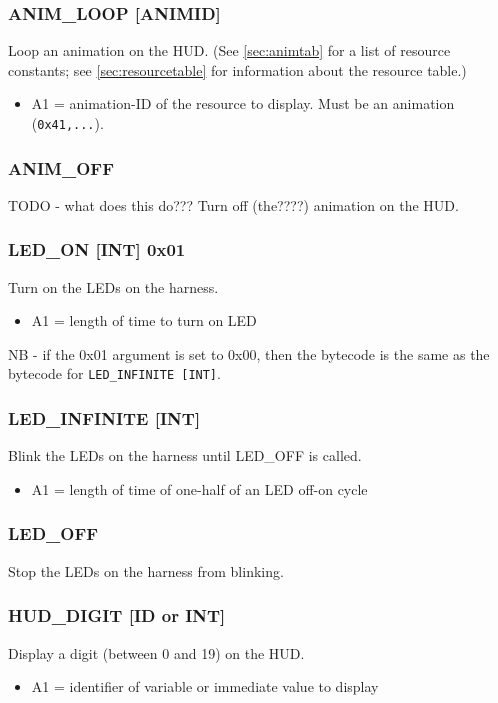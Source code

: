 \documentclass[12pt,a4paper]{scrbook}
\begin{document}
\subsubsection{ANIM\_LOOP [ANIMID]}
Loop an animation on the HUD.  (See \ref{sec:animtab} for a list of resource constants;
see \ref{sec:resourcetable} for information about the resource table.)
\begin{itemize}
\item A1 = animation-ID of the resource to display.  Must be an animation (\texttt{0x41,...}).
\end{itemize}


\subsubsection{ANIM\_OFF}
TODO - what does this do???
Turn off (the????) animation on the HUD.

\subsubsection{LED\_ON [INT] 0x01}
Turn on the LEDs on the harness.
\begin{itemize}
\item A1 = length of time to turn on LED
\end{itemize}
NB - if the 0x01 argument is set to 0x00, then the bytecode is the same as the bytecode for 
\texttt{LED\_INFINITE [INT]}.

\subsubsection{LED\_INFINITE [INT]}
Blink the LEDs on the harness until LED\_OFF is called.
\begin{itemize}
\item A1 = length of time of one-half of an LED off-on cycle
\end{itemize}

\subsubsection{LED\_OFF}
Stop the LEDs on the harness from blinking.



\subsubsection{HUD\_DIGIT [ID or INT]}
Display a digit (between 0 and 19) on the HUD. 
\begin{itemize}
\item A1 = identifier of variable or immediate value to display
\end{itemize}
\end{document}
